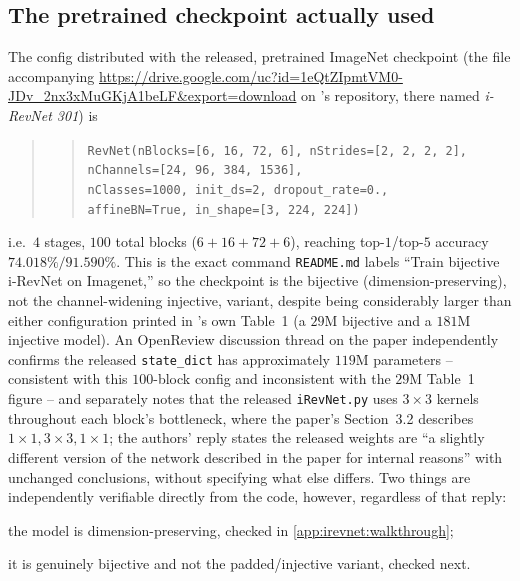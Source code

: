 \subsection{The pretrained checkpoint actually used}
\label{app:irevnet:checkpoint}
The config distributed with the released, pretrained ImageNet checkpoint (the file accompanying
\url{https://drive.google.com/uc?id=1eQtZIpmtVM0-JDv_2nx3xMuGKjA1beLF&export=download} on
\cite{jacobsen2018}'s repository, there named \emph{i-RevNet 301}) is
\begin{quote}
\begin{flushleft}
\begin{quote}
\begin{flushleft}
\texttt{RevNet(nBlocks=[6, 16, 72, 6], nStrides=[2, 2, 2, 2],}\\
\texttt{\phantom{RevNet(}nChannels=[24, 96, 384, 1536],}\\
\texttt{\phantom{RevNet(}nClasses=1000, init\_ds=2, dropout\_rate=0.,}\\
\texttt{\phantom{RevNet(}affineBN=True, in\_shape=[3, 224, 224])}
\end{flushleft}
\end{quote}
\end{flushleft}
\end{quote}
i.e.\ $4$ stages, $100$ total blocks ($6+16+72+6$), reaching top-$1$/top-$5$ accuracy $74.018\%/91.590\%$.
This is the exact command \texttt{README.md} labels ``Train bijective i-RevNet on Imagenet,'' so the
checkpoint is the bijective (dimension-preserving), not the channel-widening injective, variant, despite
being considerably larger than either configuration printed in \cite{jacobsen2018}'s own Table~1 (a $29$M
bijective and a $181$M injective model). An OpenReview discussion thread on the paper independently confirms
the released \texttt{state\_dict} has approximately $119$M parameters -- consistent with this $100$-block
config and inconsistent with the $29$M Table~1 figure -- and separately notes that the released
\texttt{iRevNet.py} uses $3\times3$ kernels throughout each block's bottleneck, where the paper's Section~3.2
describes $1\times1,3\times3,1\times1$; the authors' reply states the released weights are ``a slightly
different version of the network described in the paper for internal reasons'' with unchanged conclusions,
without specifying what else differs. Two things are independently verifiable directly from the code,
however, regardless of that reply: 
\begin{enumerate*}[label=(\roman*)]
\item the model is dimension-preserving, checked in
\cref{app:irevnet:walkthrough}; 
\item it is genuinely bijective and not the padded/injective variant, checked
next.
\end{enumerate*}

